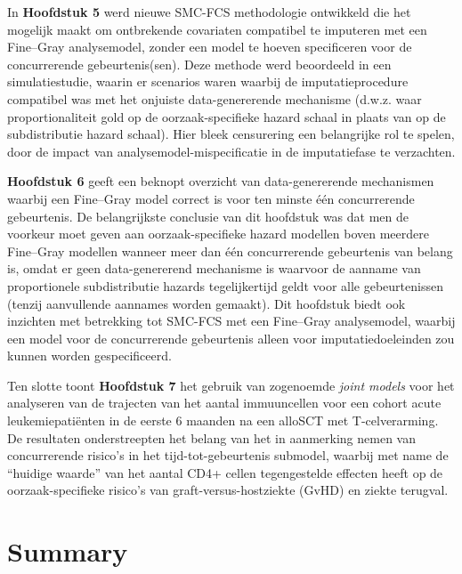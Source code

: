 \documentclass[
  letterpaper,
  paper=240mm:170mm,
  twoside=true,
  open=right,
  fontsize=10pt,
  pagesize=false,
  BCOR=15mm,
  DIV=14,
  headinclude=true,
  footinclude=false,
  headsepline=on]{scrbook}
\begin{document}
In \textbf{Hoofdstuk 5} werd nieuwe SMC-FCS methodologie ontwikkeld die
het mogelijk maakt om ontbrekende covariaten compatibel te imputeren met
een Fine--Gray analysemodel, zonder een model te hoeven specificeren
voor de concurrerende gebeurtenis(sen). Deze methode werd beoordeeld in
een simulatiestudie, waarin er scenarios waren waarbij de
imputatieprocedure compatibel was met het onjuiste data-genererende
mechanisme (d.w.z. waar proportionaliteit gold op de oorzaak-specifieke
hazard schaal in plaats van op de subdistributie hazard schaal). Hier
bleek censurering een belangrijke rol te spelen, door de impact van
analysemodel-mispecificatie in de imputatiefase te verzachten.

\textbf{Hoofdstuk 6} geeft een beknopt overzicht van data-genererende
mechanismen waarbij een Fine--Gray model correct is voor ten minste één
concurrerende gebeurtenis. De belangrijkste conclusie van dit hoofdstuk
was dat men de voorkeur moet geven aan oorzaak-specifieke hazard
modellen boven meerdere Fine--Gray modellen wanneer meer dan één
concurrerende gebeurtenis van belang is, omdat er geen data-genererend
mechanisme is waarvoor de aanname van proportionele subdistributie
hazards tegelijkertijd geldt voor alle gebeurtenissen (tenzij
aanvullende aannames worden gemaakt). Dit hoofdstuk biedt ook inzichten
met betrekking tot SMC-FCS met een Fine--Gray analysemodel, waarbij een
model voor de concurrerende gebeurtenis alleen voor imputatiedoeleinden
zou kunnen worden gespecificeerd.

Ten slotte toont \textbf{Hoofdstuk 7} het gebruik van zogenoemde
\emph{joint models} voor het analyseren van de trajecten van het aantal
immuuncellen voor een cohort acute leukemiepatiënten in de eerste 6
maanden na een alloSCT met T-celverarming. De resultaten onderstreepten
het belang van het in aanmerking nemen van concurrerende risico's in het
tijd-tot-gebeurtenis submodel, waarbij met name de ``huidige waarde''
van het aantal CD4+ cellen tegengestelde effecten heeft op de
oorzaak-specifieke risico's van graft-versus-hostziekte (GvHD) en ziekte
terugval.


\chapter*{Summary}\label{summary-1}

\end{document}
